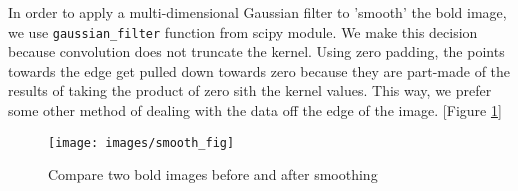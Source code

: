 \par \indent In order to apply a multi-dimensional Gaussian filter to 'smooth'
the bold image, we use \texttt{gaussian\_filter} function from scipy module. 
We make this decision because convolution does not truncate the kernel. Using
zero padding, the points towards the edge get pulled down towards zero because
they are part-made of the results of taking the product of zero sith the kernel
values. This way, we prefer some other method of dealing with the data off the
edge of the image. [Figure \ref{fig:smoothing}]
 
\begin{figure}[h!]
\centering
\texttt{[image: images/smooth\_fig]}
\caption{Compare two bold images before and after smoothing}
\label{fig:smoothing}
\end{figure}
